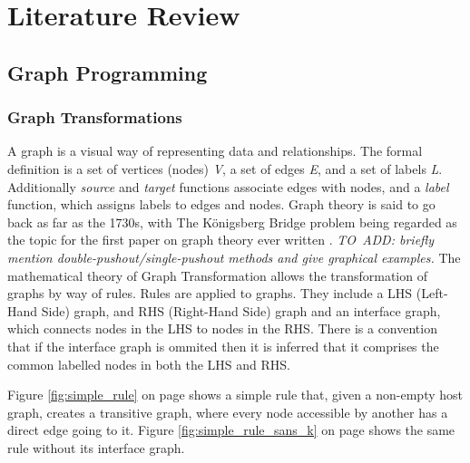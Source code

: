 \documentclass{UoYCSproject}
\begin{document}
\chapter{Literature Review}
\section{Graph Programming}
\subsection{Graph Transformations}
A graph is a visual way of representing data and relationships. The formal definition is a set of vertices (nodes) \emph{V}, a set of edges \emph{E}, and a set of labels \emph{L}. Additionally \emph{source} and \emph{target} functions associate edges with nodes, and a \emph{label} function, which assigns labels to edges and nodes.
Graph theory is said to go back as far as the 1730s, with The K{\"o}nigsberg Bridge problem being regarded as the topic for the first paper on graph theory ever written \cite{grathe_origin}.
\emph{TO~ADD: briefly mention double-pushout/single-pushout methods and give graphical examples.} %
The mathematical theory of Graph Transformation allows the transformation of graphs by way of rules. Rules are applied to graphs. They include a LHS (Left-Hand Side) graph, and RHS (Right-Hand Side) graph and an interface graph, which connects nodes in the LHS to nodes in the RHS. There is a convention that if the interface graph is ommited then it is inferred that it comprises the common labelled nodes in both the LHS and RHS.

Figure \ref{fig:simple_rule} on page \pageref{fig:simple_rule} shows a simple rule that, given a non-empty host graph, creates a transitive graph, where every node accessible by another has a direct edge going to it. Figure \ref{fig:simple_rule_sans_k} on page \pageref{fig:simple_rule_sans_k} shows the same rule without its interface graph.

\end{document}
